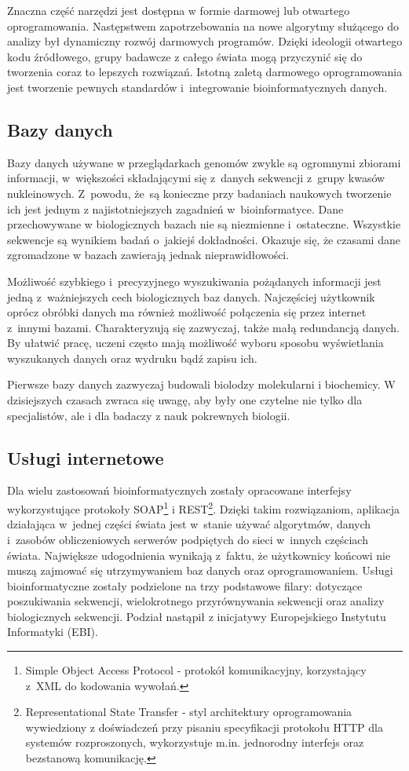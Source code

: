 \documentclass[a4paper,12pt,oneside]{mwrep}  %
\begin{document}
Znaczna część narzędzi jest dostępna w formie darmowej lub otwartego oprogramowania. Następstwem zapotrzebowania na nowe algorytmy służącego do analizy był dynamiczny rozwój darmowych programów. Dzięki ideologii otwartego kodu źródłowego, grupy badawcze z całego świata mogą przyczynić się do tworzenia coraz to lepszych rozwiązań. Istotną zaletą darmowego oprogramowania jest tworzenie pewnych standardów i~integrowanie bioinformatycznych danych.

\subsection{Bazy danych}
Bazy danych używane w przeglądarkach genomów zwykle są ogromnymi zbiorami informacji, w~większości składającymi się z~danych sekwencji z~grupy kwasów nukleinowych. Z~powodu, że~są konieczne przy badaniach naukowych tworzenie ich jest jednym z najistotniejszych zagadnień w~bioinformatyce. Dane przechowywane w biologicznych bazach nie są niezmienne i~ostateczne. Wszystkie sekwencje są wynikiem badań o~jakiejś dokładności. Okazuje się, że czasami dane zgromadzone w bazach zawierają jednak nieprawidłowości.

Możliwość szybkiego i~precyzyjnego wyszukiwania pożądanych informacji jest jedną z~ważniejszych cech biologicznych baz danych. Najczęściej użytkownik oprócz obróbki danych ma również możliwość połączenia się przez internet z~innymi bazami. Charakteryzują się zazwyczaj, także małą redundancją danych. By ułatwić pracę, uczeni często mają możliwość wyboru sposobu wyświetlania wyszukanych danych oraz wydruku bądź zapisu ich.

Pierwsze bazy danych zazwyczaj budowali biolodzy molekularni i biochemicy. W dzisiejszych czasach zwraca się uwagę, aby były one czytelne nie tylko dla specjalistów, ale i dla badaczy z nauk pokrewnych biologii.

\subsection{Usługi internetowe}
Dla wielu zastosowań bioinformatycznych zostały opracowane interfejsy wykorzystujące protokoły SOAP\footnote{Simple Object Access Protocol - protokół komunikacyjny, korzystający z~XML do kodowania wywołań.} i REST\footnote{Representational State Transfer - styl architektury oprogramowania wywiedziony z doświadczeń przy pisaniu specyfikacji protokołu HTTP dla systemów rozproszonych, wykorzystuje m.in. jednorodny interfejs oraz bezstanową komunikację.}. Dzięki takim rozwiązaniom, aplikacja działająca w~jednej części świata jest w~stanie używać algorytmów, danych i~zasobów obliczeniowych serwerów podpiętych do sieci w~innych częściach świata. Największe udogodnienia wynikają z~faktu, że użytkownicy końcowi nie muszą zajmować się utrzymywaniem baz danych oraz oprogramowaniem. Usługi bioinformatyczne zostały podzielone na trzy podstawowe filary: dotyczące poszukiwania sekwencji, wielokrotnego przyrównywania sekwencji oraz analizy biologicznych sekwencji. Podział nastąpił z inicjatywy Europejskiego Instytutu Informatyki (EBI).
\end{document}
